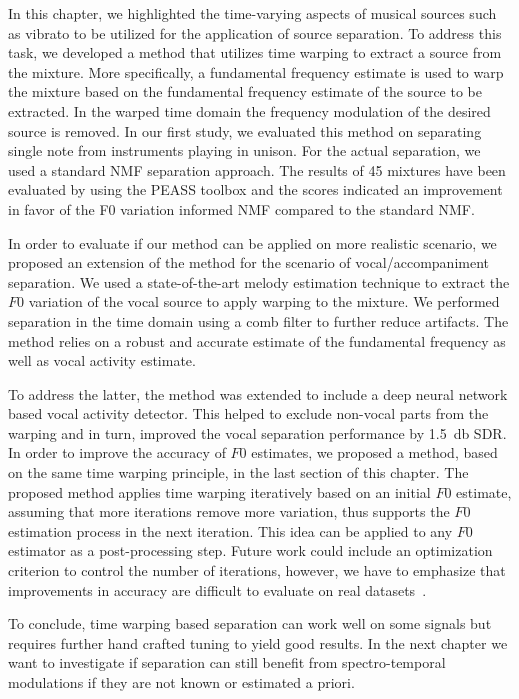 In this chapter, we highlighted the time-varying aspects of musical sources such as vibrato to be utilized for the application of source separation.
To address this task, we developed a method that utilizes time warping to extract a source from the mixture.
More specifically, a fundamental frequency estimate is used to warp the mixture based on the fundamental frequency estimate of the source to be extracted. 
In the warped time domain the frequency modulation of the desired source is removed. 
In our first study, we evaluated this method on separating single note from instruments playing in unison.
For the actual separation, we used a standard NMF separation approach.
The results of 45 mixtures have been evaluated by using the PEASS toolbox and the scores indicated an improvement in favor of the F0 variation informed NMF compared to the standard NMF.
\par
In order to evaluate if our method can be applied on more realistic scenario, we proposed an extension of the method for the scenario of vocal/accompaniment separation.
We used a state-of-the-art melody estimation technique to extract the \(F0\) variation of the vocal source to apply warping to the mixture.
We performed separation in the time domain using a comb filter to further reduce artifacts.
The method relies on a robust and accurate estimate of the fundamental frequency as well as vocal activity estimate.
\par
To address the latter, the method was extended to include a deep neural network based vocal activity detector.
This helped to exclude non-vocal parts from the warping and in turn, improved the vocal separation performance by 1.5~\si{\decibel} SDR.
In order to improve the accuracy of \(F0\) estimates, we proposed a method, based on the same time warping principle, in the last section of this chapter. 
The proposed method applies time warping iteratively based on an initial \(F0\) estimate, assuming that more iterations remove more variation, thus supports the \(F0\) estimation process in the next iteration.
This idea can be applied to any \(F0\) estimator as a post-processing step.
Future work could include an optimization criterion to control the number of iterations, however, we have to emphasize that improvements in accuracy are difficult to evaluate on real datasets~\cite{stoeter15acm}.
\par
To conclude, time warping based separation can work well on some signals but requires further hand crafted tuning to yield good results.
In the next chapter we want to investigate if separation can still benefit from spectro-temporal modulations if they are not known or estimated a priori.